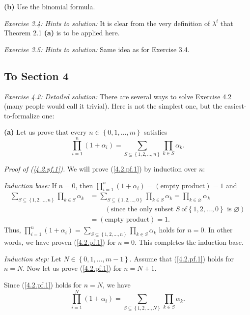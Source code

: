 \documentclass[numbers=enddot,12pt,final,onecolumn,notitlepage]{scrartcl}%
\begin{document}
\textbf{(b)} Use the binomial formula.

\textit{Exercise 3.4: Hints to solution:} It is clear from the very definition
of $\lambda^{i}$ that Theorem 2.1 \textbf{(a)} is to be applied here.

\textit{Exercise 3.5: Hints to solution:} Same idea as for Exercise 3.4.

\subsection{To Section 4}

\textit{Exercise 4.2: Detailed solution:} There are several ways to solve
Exercise 4.2 (many people would call it trivial). Here is not the simplest
one, but the easiest-to-formalize one:

\textbf{(a)} Let us prove that every $n\in\left\{  0,1,...,m\right\}  $
satisfies%
\begin{equation}
\prod\limits_{i=1}^{n}\left(  1+\alpha_{i}\right)  =\sum\limits_{S\subseteq
\left\{  1,2,...,n\right\}  }\prod\limits_{k\in S}\alpha_{k}. \label{4.2.pf.1}%
\end{equation}


\textit{Proof of (\ref{4.2.pf.1}).} We will prove (\ref{4.2.pf.1}) by
induction over $n$:

\textit{Induction base:} If $n=0$, then $\prod\limits_{i=1}^{n}\left(
1+\alpha_{i}\right)  =\left(  \text{empty product}\right)  =1$ and
\begin{align*}
\sum\limits_{S\subseteq\left\{  1,2,...,n\right\}  }\prod\limits_{k\in
S}\alpha_{k}  &  =\sum\limits_{S\subseteq\left\{  1,2,...,0\right\}  }%
\prod\limits_{k\in S}\alpha_{k}=\prod\limits_{k\in\varnothing}\alpha_{k}\\
&  \ \ \ \ \ \ \ \ \ \ \left(  \text{since the only subset }S\ \text{of
}\left\{  1,2,...,0\right\}  \text{ is }\varnothing\right) \\
&  =\left(  \text{empty product}\right)  =1.
\end{align*}
Thus, $\prod\limits_{i=1}^{n}\left(  1+\alpha_{i}\right)  =\sum
\limits_{S\subseteq\left\{  1,2,...,n\right\}  }\prod\limits_{k\in S}%
\alpha_{k}$ holds for $n=0$. In other words, we have proven (\ref{4.2.pf.1})
for $n=0$. This completes the induction base.

\textit{Induction step:} Let $N\in\left\{  0,1,...,m-1\right\}  $. Assume that
(\ref{4.2.pf.1}) holds for $n=N$. Now let us prove (\ref{4.2.pf.1}) for
$n=N+1$.

Since (\ref{4.2.pf.1}) holds for $n=N$, we have%
\[
\prod\limits_{i=1}^{N}\left(  1+\alpha_{i}\right)  =\sum\limits_{S\subseteq
\left\{  1,2,...,N\right\}  }\prod\limits_{k\in S}\alpha_{k}.
\]
\end{document}

